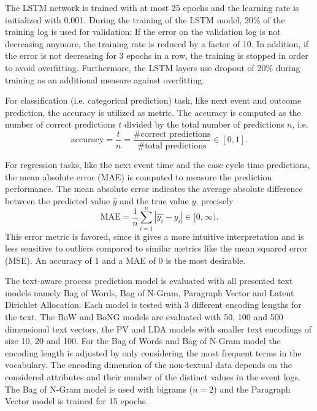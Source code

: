 The LSTM network is trained with at most 25 epochs and the learning rate is initialized with 0.001.
During the training of the LSTM model, 20\% of the training log is used for validation: If the error on the validation log is not decreasing anymore, the training rate is reduced by a factor of 10.
In addition, if the error is not decreasing for 3 epochs in a row, the training is stopped in order to avoid overfitting.
Furthermore, the LSTM layers use dropout \cite{DBLP:journals/corr/abs-1207-0580} of 20\% during training as an additional measure against overfitting.

For classification (i.e. categorical prediction) task, like next event and outcome prediction, the accuracy is utilized as metric.
The accuracy is computed as the number of correct predictions $t$ divided by the total number of predictions $n$, i.e. 
\begin{equation*}
	\textrm{accuracy} = \dfrac{t}{n} = \dfrac{\textrm{\# correct predictions}}{\textrm{\# total predictions}} \in [0,1].
\end{equation*}

For regression tasks, like the next event time and the case cycle time predictions, the mean absolute error (MAE) is computed to measure the prediction performance. The mean absolute error indicates the average absolute difference between the predicted value $\hat{y}$ and the true value $y$,  precisely
\begin{equation*}
	\textrm{MAE} = \dfrac{1}{n}\sum_{i=1}^{n}|\hat{y_i} - y_i| \in [0, \infty).
\end{equation*}
This error metric is favored, since it gives a more intuitive interpretation and is less sensitive to outliers compared to similar metrics like the mean squared error (MSE).
An accuracy of 1 and a MAE of 0 is the most desirable.

The text-aware process prediction model is evaluated with all presented text models namely Bag of Words, Bag of N-Gram, Paragraph Vector and Latent Dirichlet Allocation.
Each model is tested with 3 different encoding lengths for the text.
The BoW and BoNG models are evaluated with 50, 100 and 500 dimensional text vectors, the PV and LDA models with smaller text encodings of size 10, 20 and 100.
For the Bag of Words and Bag of N-Gram model the encoding length is adjusted by only considering the most frequent terms in the vocabulary.
The encoding dimension of the non-textual data depends on the considered attributes and their number of the distinct values in the event logs.
The Bag of N-Gram model is used with bigrams ($n=2$) and the Paragraph Vector model is trained for 15 epochs.


